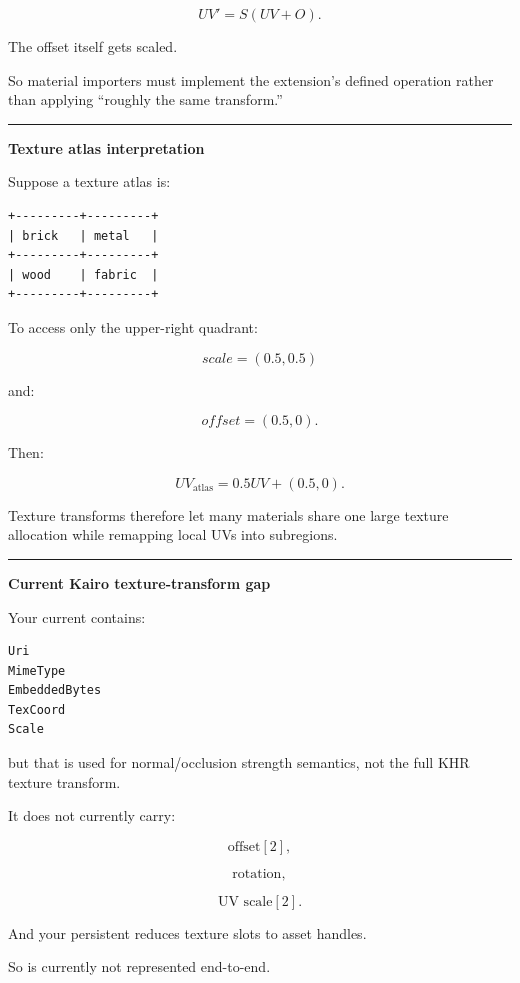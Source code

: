 \[
UV'=S(UV+O).
\]

The offset itself gets scaled.

So material importers must implement the extension's defined operation rather than applying ``roughly the same transform.''

\begin{center}\rule{0.5\linewidth}{0.5pt}\end{center}

\textbf{Texture atlas interpretation}

Suppose a texture atlas is:

\begin{verbatim}
+---------+---------+
| brick   | metal   |
+---------+---------+
| wood    | fabric  |
+---------+---------+
\end{verbatim}

To access only the upper-right quadrant:

\[
scale=(0.5,0.5)
\]

and:

\[
offset=(0.5,0).
\]

Then:

\[
UV_{\text{atlas}}
=
0.5UV+
(0.5,0).
\]

Texture transforms therefore let many materials share one large texture allocation while remapping local UVs into subregions.

\begin{center}\rule{0.5\linewidth}{0.5pt}\end{center}

\textbf{Current Kairo texture-transform gap}

Your current  contains:

\begin{verbatim}
Uri
MimeType
EmbeddedBytes
TexCoord
Scale
\end{verbatim}

but that  is used for normal/occlusion strength semantics, not the full KHR texture transform.

It does not currently carry:

\[
\text{offset}[2],
\]

\[
\text{rotation},
\]

\[
\text{UV scale}[2].
\]

And your persistent  reduces texture slots to asset handles.

So  is currently not represented end-to-end.

